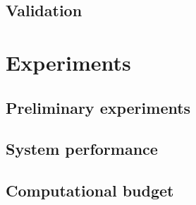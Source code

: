 \subsection{Validation}


\section{Experiments}
\label{sec:experiments}

\subsection{Preliminary experiments}
\subsection{System performance}
\subsection{Computational budget}

